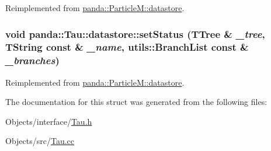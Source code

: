 Reimplemented from \hyperlink{structpanda_1_1ParticleM_1_1datastore_ab9f9e7afb145c12941baa10892ed1811}{panda::ParticleM::datastore}.\hypertarget{structpanda_1_1Tau_1_1datastore_a528e0b260c39c11862f8631cf9e1743e}{
\subsubsection[{setStatus}]{\setlength{\rightskip}{0pt plus 5cm}void panda::Tau::datastore::setStatus (TTree \& {\em \_\-tree}, \/  TString const \& {\em \_\-name}, \/  {\bf utils::BranchList} const \& {\em \_\-branches})}}
\label{structpanda_1_1Tau_1_1datastore_a528e0b260c39c11862f8631cf9e1743e}


Reimplemented from \hyperlink{structpanda_1_1ParticleM_1_1datastore_a0329bec2c84d16ff16e15824890e7a86}{panda::ParticleM::datastore}.

The documentation for this struct was generated from the following files:\begin{DoxyCompactItemize}
\item 
Objects/interface/\hyperlink{Tau_8h}{Tau.h}\item 
Objects/src/\hyperlink{Tau_8cc}{Tau.cc}\end{DoxyCompactItemize}
